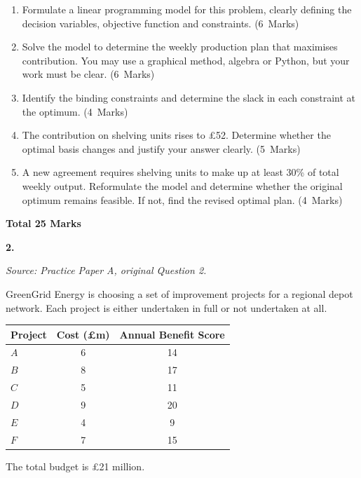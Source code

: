 \documentclass[11pt,a4paper]{article}
\newcommand{\markalloc}[1]{\nobreak\hfill\mbox{(#1 Marks)}}
\newcommand{\questiontotal}[1]{\begin{flushright}\textbf{Total #1 Marks}\end{flushright}}
\begin{document}
\begin{enumerate}
\item Formulate a linear programming model for this problem, clearly defining the decision variables, objective function and constraints. \markalloc{6}

\item Solve the model to determine the weekly production plan that maximises contribution. You may use a graphical method, algebra or Python, but your work must be clear. \markalloc{6}

\item Identify the binding constraints and determine the slack in each constraint at the optimum. \markalloc{4}

\item The contribution on shelving units rises to \pounds52. Determine whether the optimal basis changes and justify your answer clearly. \markalloc{5}

\item A new agreement requires shelving units to make up at least 30\% of total weekly output. Reformulate the model and determine whether the original optimum remains feasible. If not, find the revised optimal plan. \markalloc{4}
\end{enumerate}

\questiontotal{25}

\newpage

\textbf{2.}

\textit{Source: Practice Paper A, original Question 2.}



GreenGrid Energy is choosing a set of improvement projects for a regional depot network.
Each project is either undertaken in full or not undertaken at all.

\begin{center}
\begin{tabular}{lcc}
\toprule
Project & Cost (\pounds m) & Annual Benefit Score \\
\midrule
$A$ & 6 & 14 \\
$B$ & 8 & 17 \\
$C$ & 5 & 11 \\
$D$ & 9 & 20 \\
$E$ & 4 & 9 \\
$F$ & 7 & 15 \\
\bottomrule
\end{tabular}
\end{center}

The total budget is \pounds21 million.
\end{document}
